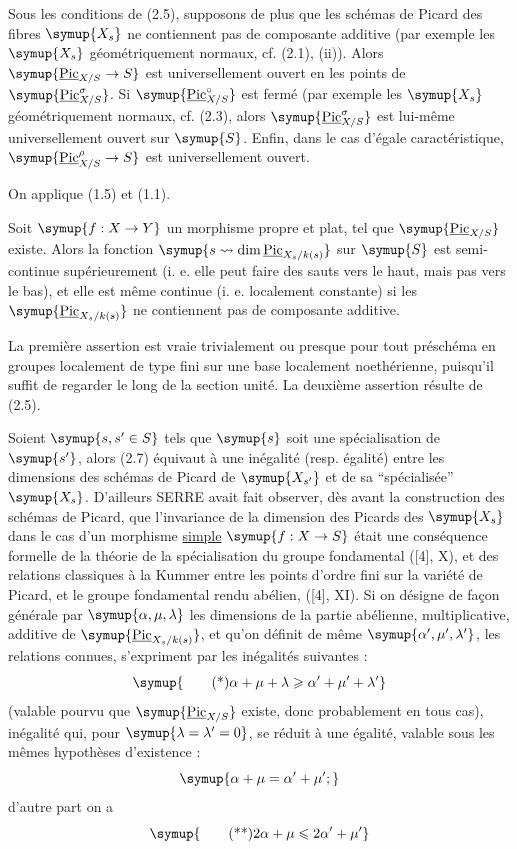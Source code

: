  Sous les conditions de (2.5), supposons de plus que les
schémas de Picard des fibres $\symup{X_s}$ ne contiennent pas de composante additive
(par exemple les $\symup{X_s}$ géométriquement normaux, cf. (2.1), (ii)). Alors
$\symup{\underline{\operatorname{Pic}}_{X/S}\to S}$ est universellement ouvert en les
points de $\symup{\underline{\operatorname{Pic}}_{X/S}^\sigma}$. Si
$\symup{\underline{\operatorname{Pic}}_{X/S}^\circ}$ est fermé (par exemple les $\symup{X_s}$
géométriquement normaux, cf. (2.3), alors
$\symup{\underline{\operatorname{Pic}}_{X/S}^\sigma}$ est lui-même universellement ouvert sur $\symup{S}$.
Enfin, dans le cas d'égale caractéristique,
$\symup{\underline{\operatorname{Pic}}_{X/S}^\rho\to S}$ est universellement ouvert.

On applique (1.5) et (1.1).

 Soit $\symup{f:X\to Y}$ un morphisme propre et
plat, tel que $\symup{\underline{\operatorname{Pic}}_{X/S}}$ existe. Alors la fonction $\symup{s\rightsquigarrow\dim\underline{\operatorname{Pic}}_{X_s/k(s)}}$ sur $\symup{S}$ est semi-continue supérieurement (i. e. elle peut faire des sauts vers
le haut, mais pas vers le bas), et elle est même continue (i. e. localement
constante) si les $\symup{\underline{\operatorname{Pic}}_{X_s/k(s)}}$ ne contiennent pas de
composante additive.

La première assertion est vraie trivialement ou presque pour tout préschéma en
groupes localement de type fini sur une base localement noethérienne, puisqu'il
suffit de regarder le long de la section unité. La deuxième assertion résulte
de (2.5).

 Soient $\symup{s,s'\in S}$ tels que $\symup{s}$ soit une spécialisation
de $\symup{s'}$, alors (2.7) équivaut à une inégalité (resp. égalité) entre les
dimensions des schémas de Picard de $\symup{X_{s'}}$ et de sa ``spécialisée'' $\symup{X_s}$.
D'ailleurs SERRE avait fait observer, dès avant la construction des schémas de
Picard, que l'invariance de la dimension des Picards des $\symup{X_s}$ dans le cas d'un
morphisme \uline{simple} $\symup{f:X\to S}$ était une conséquence formelle de la
théorie de la spécialisation du groupe fondamental ([4], X), et des relations
classiques à la Kummer entre les points d'ordre fini sur la variété de Picard,
et le groupe fondamental rendu abélien, ([4], XI). Si on désigne de façon
générale par $\symup{\alpha,\mu,\lambda}$ les dimensions de la partie abélienne,
multiplicative, additive de $\symup{\underline{\operatorname{Pic}}_{X_s/k(s)}}$, et qu'on
définit de même $\symup{\alpha',\mu',\lambda'}$, les relations connues, s'expriment par
les inégalités suivantes :
\[
\symup{\tag{*}\alpha+\mu+\lambda\geqslant\alpha'+\mu'+\lambda'}
\]
(valable pourvu que $\symup{\underline{\operatorname{Pic}}_{X/S}}$ existe, donc probablement en
tous cas), inégalité qui, pour $\symup{\lambda=\lambda'=0}$, se réduit à une égalité,
valable sous les mêmes hypothèses d'existence :
\[
\symup{\alpha+\mu=\alpha'+\mu' ;}
\]
d'autre part on a
\[
\symup{\tag{**}2\alpha+\mu\leqslant2\alpha'+\mu'}
\]

